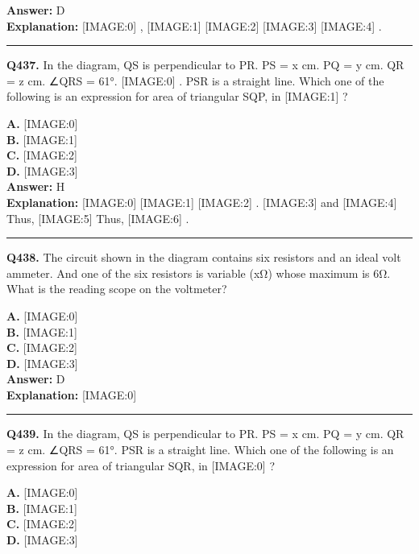 \documentclass[12pt]{article}
\begin{document}
\textbf{Answer:} D \\
\textbf{Explanation:} [IMAGE:0]
,
[IMAGE:1]
[IMAGE:2]
[IMAGE:3]
[IMAGE:4]
.

\hrule
\vspace{1em}


\noindent
\textbf{Q437.} In the diagram, QS is perpendicular to PR. PS = x cm. PQ = y cm. QR = z cm. ∠QRS = 61°.
[IMAGE:0]
. PSR is a straight line.
Which one of the following is an expression for area of triangular SQP, in
[IMAGE:1]
?



\textbf{A.} [IMAGE:0] \\
\textbf{B.} [IMAGE:1] \\
\textbf{C.} [IMAGE:2] \\
\textbf{D.} [IMAGE:3] \\

\textbf{Answer:} H \\
\textbf{Explanation:} [IMAGE:0]
[IMAGE:1]
[IMAGE:2]
.
[IMAGE:3]
and
[IMAGE:4]
Thus,
[IMAGE:5]
Thus,
[IMAGE:6]
.

\hrule
\vspace{1em}


\noindent
\textbf{Q438.} The circuit shown in the diagram contains six resistors and an ideal volt ammeter. And one of the six resistors is variable (xΩ) whose maximum is 6Ω.
What is the reading scope on the voltmeter?



\textbf{A.} [IMAGE:0] \\
\textbf{B.} [IMAGE:1] \\
\textbf{C.} [IMAGE:2] \\
\textbf{D.} [IMAGE:3] \\

\textbf{Answer:} D \\
\textbf{Explanation:} [IMAGE:0]

\hrule
\vspace{1em}


\noindent
\textbf{Q439.} In the diagram, QS is perpendicular to PR. PS = x cm. PQ = y cm. QR = z cm. ∠QRS = 61°. PSR is a straight line.
Which one of the following is an expression for area of triangular SQR, in
[IMAGE:0]
?



\textbf{A.} [IMAGE:0] \\
\textbf{B.} [IMAGE:1] \\
\textbf{C.} [IMAGE:2] \\
\textbf{D.} [IMAGE:3] \\
\end{document}
